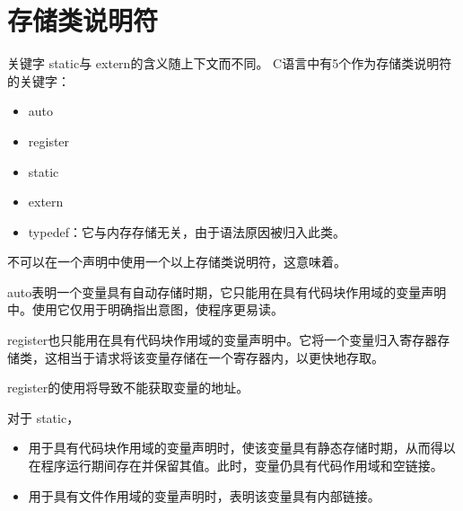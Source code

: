 \section{存储类说明符}

\begin{frame}[fragile]\ft{\subsecname} 
  关键字{ static}与{ extern}的含义随上下文而不同。{ C}语言中有5个作为存储类说明符的关键字：
  \begin{itemize}
  \item { auto}
  \item { register}
  \item { static}
  \item { extern}
  \item { typedef}：它与内存存储无关，由于语法原因被归入此类。
  \end{itemize}
\end{frame}


\begin{frame}[fragile]\ft{\subsecname}
  \begin{zhu}
    不可以在一个声明中使用一个以上存储类说明符，这意味着。
  \end{zhu}
\end{frame}


\begin{frame}[fragile]\ft{\subsecname}
  { auto}表明一个变量具有自动存储时期，它只能用在具有代码块作用域的变量声明中。使用它仅用于明确指出意图，使程序更易读。
\end{frame}

\begin{frame}[fragile]\ft{\subsecname}
  { register}也只能用在具有代码块作用域的变量声明中。它将一个变量归入寄存器存储类，这相当于请求将该变量存储在一个寄存器内，以更快地存取。

  { register}的使用将导致不能获取变量的地址。
\end{frame}

\begin{frame}[fragile]\ft{\subsecname}
  对于{ static}，
  \begin{itemize}
  \item 用于具有代码块作用域的变量声明时，使该变量具有静态存储时期，从而得以在程序运行期间存在并保留其值。此时，变量仍具有代码作用域和空链接。
  \item 用于具有文件作用域的变量声明时，表明该变量具有内部链接。
  \end{itemize}
\end{frame}

